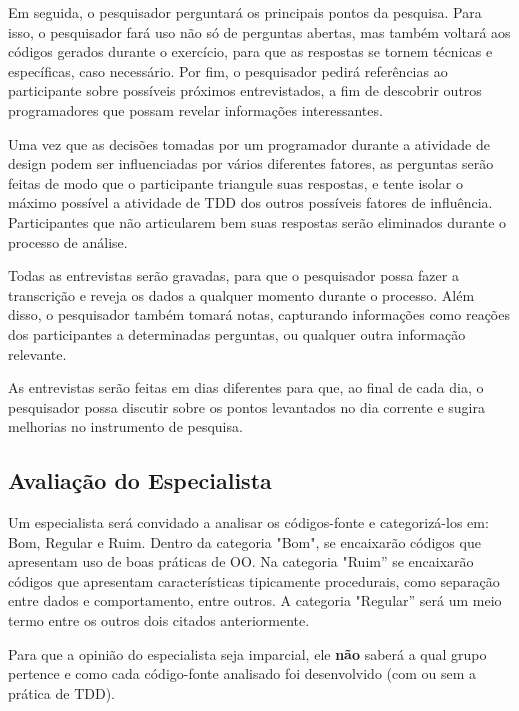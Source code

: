 Em seguida, o pesquisador perguntará os principais pontos da pesquisa.
Para isso, o pesquisador fará uso não só de perguntas abertas, mas também
voltará aos códigos gerados durante o exercício, para que as respostas se tornem técnicas e
específicas, caso necessário. 
Por fim, o pesquisador pedirá referências ao participante sobre
possíveis próximos entrevistados, a fim de descobrir outros programadores que possam
revelar informações interessantes.

Uma vez que as decisões tomadas por um programador durante a atividade de design
podem ser influenciadas por vários diferentes fatores, 
as perguntas serão feitas de modo que o participante triangule suas respostas,
e tente isolar o máximo possível a atividade de TDD dos outros possíveis fatores
de influência. Participantes que não articularem bem suas respostas serão eliminados
durante o processo de análise.

Todas as entrevistas serão gravadas, para que o pesquisador possa fazer a
transcrição e reveja os dados a qualquer momento durante o processo. Além disso,
o pesquisador também tomará notas, capturando informações como reações dos 
participantes a determinadas perguntas, ou qualquer outra informação relevante. 

As entrevistas serão feitas em dias diferentes para que, ao final
de cada dia, o pesquisador possa discutir sobre os pontos levantados no dia
corrente e sugira melhorias no instrumento de pesquisa. 

\subsection{Avaliação do Especialista}
\label{sec:planejamento-especialista}

Um especialista será convidado a analisar os códigos-fonte e categorizá-los
em: Bom, Regular e Ruim. Dentro da categoria "Bom", se encaixarão códigos 
que apresentam uso de boas práticas de OO. Na categoria "Ruim'' se encaixarão códigos
que apresentam características tipicamente procedurais, como separação entre
dados e comportamento, entre outros. A categoria "Regular'' será um meio termo entre
os outros dois citados anteriormente.

Para que a opinião do especialista seja imparcial, ele \textbf{não} saberá a qual grupo
pertence e como cada código-fonte analisado foi desenvolvido (com ou sem a prática de TDD).

